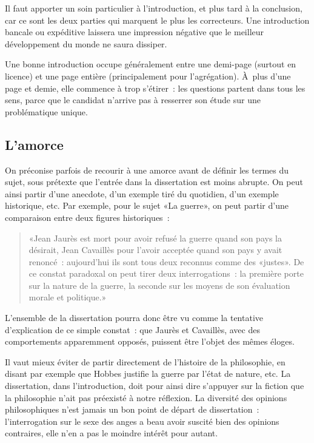 \documentclass[a4paper,11pt]{article}
\begin{document}
Il faut apporter un soin particulier à l'introduction, et plus tard à la
conclusion, car ce sont les deux parties qui marquent le plus les
correcteurs. Une introduction bancale ou expéditive laissera une
impression négative que le meilleur développement du monde ne saura
dissiper.

\par

Une bonne introduction occupe généralement entre une demi-page (surtout
en licence) et une page entière (principalement pour l'agrégation).
À~plus d'une page et demie, elle commence à trop s'étirer~: les
questions partent dans tous les sens, parce que le candidat n'arrive pas
à resserrer son étude sur une problématique unique.


\subsection{L'amorce}

On préconise parfois de recourir à une amorce avant de définir les
termes du sujet, sous prétexte que l'entrée dans la dissertation est
moins abrupte. On peut ainsi partir d'une anecdote, d'un exemple tiré du
quotidien, d'un exemple historique, etc. Par exemple, pour le sujet «La
guerre», on peut partir d'une comparaison entre deux figures
historiques~:

\begin{quote}
  «Jean Jaurès est mort pour avoir refusé la guerre quand son pays la
  désirait, Jean Cavaillès pour l'avoir acceptée quand son pays y avait
  renoncé~: aujourd'hui ils sont tous deux reconnus comme des
  «justes». De ce constat paradoxal on peut tirer deux interrogations~:
  la première porte sur la nature de la guerre, la seconde sur les
  moyens de son évaluation morale et politique.»
\end{quote}
L'ensemble de la dissertation pourra donc être vu comme la tentative
d'explication de ce simple constat~: que Jaurès et Cavaillès, avec des
comportements apparemment opposés, puissent être l'objet des mêmes
éloges.

\par

Il vaut mieux éviter de partir directement de l'histoire de la
philosophie, en disant par exemple que Hobbes justifie la guerre par
l'état de nature, etc. La dissertation, dans l'introduction, doit pour
ainsi dire s'appuyer sur la fiction que la philosophie n'ait pas
préexisté à notre réflexion. La diversité des opinions philosophiques
n'est jamais un bon point de départ de dissertation~: l'interrogation
sur le sexe des anges a beau avoir suscité bien des opinions contraires,
elle n'en a pas le moindre intérêt pour autant.
\end{document}

